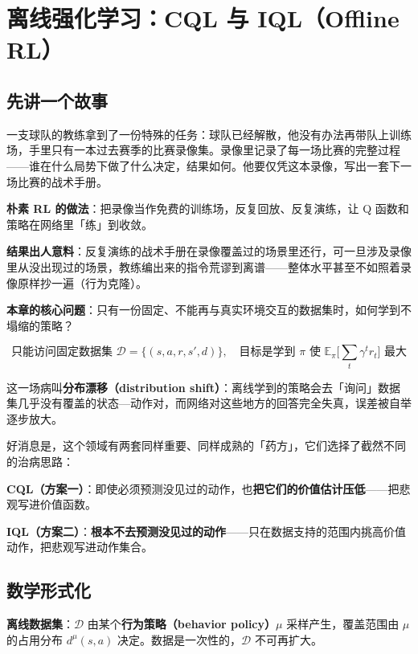\documentclass{article}
\begin{document}
\section*{离线强化学习：CQL 与 IQL（Offline RL）}

\subsection*{先讲一个故事}

一支球队的教练拿到了一份特殊的任务：球队已经解散，他没有办法再带队上训练场，手里只有一本过去赛季的比赛录像集。录像里记录了每一场比赛的完整过程——谁在什么局势下做了什么决定，结果如何。他要仅凭这本录像，写出一套下一场比赛的战术手册。

\textbf{朴素 RL 的做法}：把录像当作免费的训练场，反复回放、反复演练，让 Q 函数和策略在网络里「练」到收敛。

\textbf{结果出人意料}：反复演练的战术手册在录像覆盖过的场景里还行，可一旦涉及录像里从没出现过的场景，教练编出来的指令荒谬到离谱——整体水平甚至不如照着录像原样抄一遍（行为克隆）。

\textbf{本章的核心问题}：只有一份固定、不能再与真实环境交互的数据集时，如何学到不塌缩的策略？

\[
\boxed{\text{只能访问固定数据集 } \mathcal{D}=\{(s,a,r,s',d)\},\quad \text{目标是学到 } \pi \text{ 使 } \mathbb{E}_\pi\!\Big[\sum_t \gamma^t r_t\Big] \text{ 最大}}
\]

这一场病叫\textbf{分布漂移（distribution shift）}：离线学到的策略会去「询问」数据集几乎没有覆盖的状态—动作对，而网络对这些地方的回答完全失真，误差被自举逐步放大。

好消息是，这个领域有两套同样重要、同样成熟的「药方」，它们选择了截然不同的治病思路：

\textbf{CQL（方案一）}：即使必须预测没见过的动作，也\textbf{把它们的价值估计压低}——把悲观写进价值函数。

\textbf{IQL（方案二）}：\textbf{根本不去预测没见过的动作}——只在数据支持的范围内挑高价值动作，把悲观写进动作集合。

\subsection*{数学形式化}

\textbf{离线数据集}：$\mathcal{D}$ 由某个\textbf{行为策略（behavior policy）}$\mu$ 采样产生，覆盖范围由 $\mu$ 的占用分布 $d^\mu(s,a)$ 决定。数据是一次性的，$\mathcal{D}$ 不可再扩大。
\end{document}
